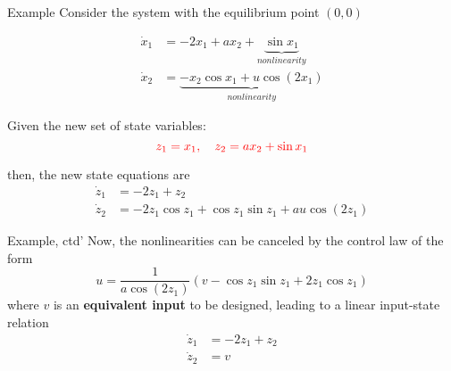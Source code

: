 \documentclass{beamer}
\begin{document}
  \begin{frame}{Example}
  Consider the system with the equilibrium point $(0, 0)$

  \begin{equation}\label{input-state-example}
  \begin{aligned}
    \dot{x}_{1} &= -2x_{1}+ax_{2}+\underbrace{\sin x_{1}}_{nonlinearity} \\
    \dot{x}_{2} &= \underbrace{-x_{2}\cos x_{1} + u \cos(2x_{1})}_{nonlinearity}
  \end{aligned}
  \end{equation}

  Given the new set of state variables:
  $$ {\color{red} z_{1}=x_{1} , \quad z_{2}=ax_{2} + \sin x_{1}} $$

  then, the new state equations are
    \begin{equation}\label{new-state}
      \begin{aligned}
        \dot{z}_{1} &= -2 z_{1}+z_{2} \\
        \dot{z}_{2} &= -2 z_{1} \cos z_{1}+\cos z_{1} \sin z_{1}+a u \cos \left(2 z_{1}\right)
      \end{aligned}
    \end{equation}
  \end{frame}


  \begin{frame}{Example, ctd'}
  Now, the nonlinearities can be canceled by the control law of the form
  $$
    u=\frac{1}{a \cos \left(2 z_{1}\right)}\left(v-\cos z_{1} \sin z_{1}+2 z_{1} \cos z_{1}\right)
  $$
  where $v$ is an \textbf{equivalent input} to be designed, leading to a linear input-state relation
  \begin{equation}\label{input-state-relation}
    \begin{aligned}
      \dot{z}_{1} &= -2z_{1} + z_{2} \\
      \dot{z}_{2} &= v
    \end{aligned}
  \end{equation}
\begin{figure}
  \centering
    \end{figure}
  \end{frame}
\end{document}
